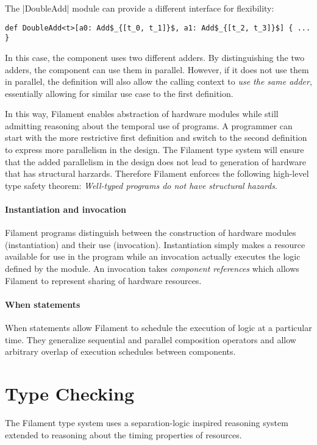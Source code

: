 \documentclass[acmsmall,review,anonymous]{acmart}
\begin{document}
The \code|DoubleAdd| module can provide a different interface for flexibility:
%
\begin{lstlisting}
def DoubleAdd<t>[a0: Add$_{[t_0, t_1]}$, a1: Add$_{[t_2, t_3]}$] { ... }
\end{lstlisting}
%
In this case, the component uses two different adders.
By distinguishing the two adders, the component can use them in parallel.
However, if it does not use them in parallel, the definition will also allow
the calling context to \emph{use the same adder}, essentially allowing for
similar use case to the first definition.

In this way, Filament enables abstraction of hardware modules while still
admitting reasoning about the temporal use of programs.
A programmer can start with the more restrictive first definition and switch to
the second definition to express more parallelism in the design.
The Filament type system will ensure that the added parallelism in the design
does not lead to generation of hardware that has structural harzards.
Therefore Filament enforces the following high-level type safety theorem:
\emph{Well-typed programs do not have structural hazards}.

\paragraph{Instantiation and invocation}
Filament programs distinguish between the construction of hardware modules
(instantiation) and their use (invocation).
Instantiation simply makes a resource available for use in the program while
an invocation actually executes the logic defined by the module.
An invocation takes \emph{component references} which allows Filament to
represent sharing of hardware resources.

\paragraph{When statements}
When statements allow Filament to schedule the execution of logic at a particular
time.
They generalize sequential and parallel composition operators and allow
arbitrary overlap of execution schedules between components.

\section{Type Checking}

The Filament type system uses a separation-logic inspired reasoning system
extended to reasoning about the timing properties of resources.
\end{document}
